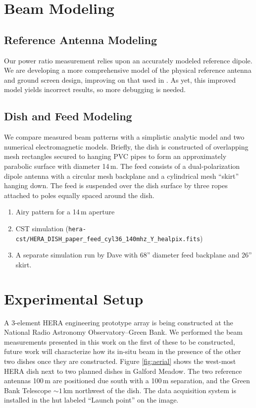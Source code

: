 \documentclass[preprint]{aastex}
\begin{document}
\section{Beam Modeling}

\subsection{Reference Antenna Modeling}
Our power ratio measurement relies upon an accurately modeled reference dipole. We are developing a more comprehensive model of the physical reference antenna and ground screen design, improving on that used in \citep{neben15}. As yet, this improved model yields incorrect results, so more debugging is needed.

\subsection{Dish and Feed Modeling}
\label{sec:dishmodels}

We compare measured beam patterns with a simplistic analytic model and two numerical electromagnetic models. Briefly, the dish is constructed of overlapping mesh rectangles secured to hanging PVC pipes to form an approximately parabolic surface with diameter 14\,m. The feed consists of a dual-polarization dipole antenna with a circular mesh backplane and a cylindrical mesh ``skirt'' hanging down. The feed is suspended over the dish surface by three ropes attached to poles equally spaced around the dish.

\begin{enumerate}
	\item Airy pattern for a 14\,m aperture
	\item CST simulation (\texttt{hera-cst/HERA\_DISH\_paper\_feed\_cyl36\_140mhz\_Y\_healpix.fits})
	\item A separate simulation run by Dave with 68'' diameter feed backplane and 26'' skirt.
\end{enumerate}


\section{Experimental Setup}

A 3-element HERA engineering prototype array is being constructed at the National Radio Astronomy Observatory--Green Bank. We performed the beam measurements presented in this work on the first of these to be constructed, future work will characterize how its in-situ beam in the presence of the other two dishes once they are constructed. Figure \ref{fig:aerial} shows the west-most HERA dish next to two planned dishes in Galford Meadow. The two reference antennas 100\,m are positioned due south with a 100\,m separation, and the Green Bank Telescope $\sim1$\,km northwest of the dish. The data acquisition system is installed in the hut labeled ``Launch point'' on the image. 
\end{document}
